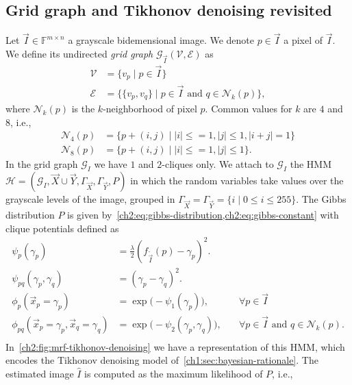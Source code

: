 \subsection{Grid graph and Tikhonov denoising revisited}
Let $\vec{I} \in \mathbb{F}^{m \times n}$ a grayscale bidemensional image. We denote $p \in \vec{I}$ a pixel of $\vec{I}$.  We define its undirected \emph{grid graph} $\mathcal{G}_{\vec{I}}(\mathcal{V},\mathcal{E})$ as
\begin{align*}
	\mathcal{V} &= \{ v_p \; | \; p \in \vec{I} \} \\
	\mathcal{E} &= \big\{ \{v_p,v_q\} \; | \; p \in \vec{I} \text{ and } q \in \mathcal{N}_k(p) \big\},
\end{align*}
%
where $\mathcal{N}_k(p)$ is the $k$-neighborhood of pixel $p$. Common values for $k$ are $4$ and $8$, i.e., 
\begin{align*}
	\mathcal{N}_4(p) &= \{ p + (i,j) \; | \; |i| \leq=1, |j| \leq 1, |i+j|=1 \}\\
	\mathcal{N}_8(p) &= \{ p + (i,j) \; | \; |i| \leq=1, |j| \leq 1 \}.
\end{align*}
%
In the grid graph $\mathcal{G}_I$ we have $1$ and $2$-cliques only. We attach to $\mathcal{G}_I$ the HMM $\mathcal{H} = (\mathcal{G}_I,\vec{X} \cup \vec{Y},\Gamma_{\vec{X}},\Gamma_{\vec{Y}},P)$ in which the random variables take values over the grayscale levels of the image, grouped in $\Gamma_{\vec{X}} = \Gamma_{\vec{Y}} = \{i \; | \; 0 \leq i \leq 255 \}$. The Gibbs distribution $P$ is given by~\cref{ch2:eq:gibbs-distribution,ch2:eq:gibbs-constant} with clique potentials defined as
\begin{equation*}
	\begin{array}{rll}
	\psi_{p}(\gamma_p) &=  \frac{\lambda}{2} \left( f_{\widetilde{\vec{I}}}(p) - \gamma _p \right) ^2. & \\
	\psi_{pq}(\gamma_p, \gamma_q) &= ( \gamma _p - \gamma _q )^2. &\\[1em]
	\phi_p(\vec{x}_p=\gamma _p) &= \exp\big( - \psi_1(\gamma_p) \big),& \quad \forall p \in \vec{I} \\
	\phi_{pq}(\vec{x}_p=\gamma_p, \vec{x}_q=\gamma _q) &= \exp\big( - \psi_{2}(\gamma_p,\gamma_q) \big),& \quad \forall p \in \vec{I} \text{ and }  q \in \mathcal{N}_k(p). \\
	\end{array}
\end{equation*}
%
In~\cref{ch2:fig:mrf-tikhonov-denoising} we have a representation of this HMM, which encodes the Tikhonov denoising model of~\cref{ch1:sec:bayesian-rationale}. The estimated image $\widehat{I}$ is computed as the maximum likelihood of $P$, i.e.,
